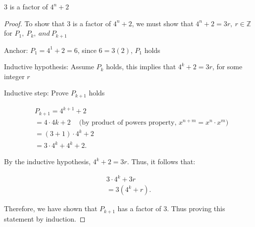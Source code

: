 \documentclass{report}
\begin{document}
    \pagebreak \bigbreak \noindent  
    \begin{prop}
       $3$ is a factor of $4^{n} + 2$ 
    \end{prop}
    \bigbreak \noindent 
    \begin{proof}
        To show that 3 is a factor of $4^{n} + 2$, we must show that $4^{n} + 2 = 3r,\ r \in \mathbb{Z}$ for $P_{1},\ P_{k},\ and\ P_{k+1}$
        \bigbreak \noindent 

        Anchor: $P_{1} = 4^{1} + 2 = 6$, since $6 = 3(2)$, $P_{1}$ holds
        \bigbreak \noindent 

        Inductive hypothesis: Assume $P_{k}$ holds, this implies that $4^{k} + 2 = 3r$, for some integer $r$
        \bigbreak \noindent 

        Inductive step: Prove $P_{k+1}$ holds

        \begin{align*}
            &P_{k+1} = 4^{k+1} + 2 \\
            &= 4\cdot 4k+2\ \quad \text{(by product of powers property, $x^{n+m} = x^{n} \cdot x^{m}$)} \\
            &=(3+1)\cdot 4^{k}  +2  \\
            &=3\cdot 4^{k} +4^{k}  + 2
        .\end{align*}
        \bigbreak \noindent 

        By the inductive hypothesis, $4^{k} + 2 = 3r$. Thus, it follows that:

        \begin{align*}
            3\cdot 4^{k} + 3r \\
            = 3(4^{k} + r)
        .\end{align*}
        \bigbreak \noindent 

        Therefore, we have shown that $P_{k+1}$ has a factor of 3. Thus proving this statement by induction.
        \bigbreak \noindent \ep


    \end{proof}
\end{document}
